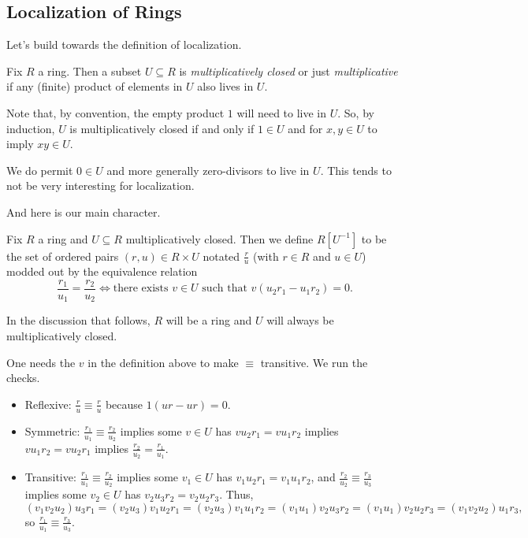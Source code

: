 \documentclass[../notes.tex]{subfiles}
\begin{document}
\subsection{Localization of Rings}
Let's build towards the definition of localization.
\begin{definition}
	Fix $R$ a ring. Then a subset $U\subseteq R$ is \textit{multiplicatively closed} or just \textit{multiplicative} if any (finite) product of elements in $U$ also lives in $U$.
\end{definition}
Note that, by convention, the empty product $1$ will need to live in $U$. So, by induction, $U$ is multiplicatively closed if and only if $1\in U$ and for $x,y\in U$ to imply $xy\in U$.
\begin{remark}
	We do permit $0\in U$ and more generally zero-divisors to live in $U$. This tends to not be very interesting for localization.
\end{remark}
And here is our main character.
\begin{definition}
	Fix $R$ a ring and $U\subseteq R$ multiplicatively closed. Then we define $R\left[U^{-1}\right]$ to be the set of ordered pairs $(r,u)\in R\times U$ notated $\frac ru$ (with $r\in R$ and $u\in U$) modded out by the equivalence relation
	\[\frac{r_1}{u_1}=\frac{r_2}{u_2}\iff\text{there exists }v\in U\text{ such that }v(u_2r_1-u_1r_2)=0.\]
\end{definition}
In the discussion that follows, $R$ will be a ring and $U$ will always be multiplicatively closed.
\begin{remark}[Nir] \label{lem:localizeequiv}
	One needs the $v$ in the definition above to make $\equiv$ transitive. We run the checks.
	\begin{itemize}
		\item Reflexive: $\frac ru\equiv\frac ru$ because $1(ur-ur)=0$.
		\item Symmetric: $\frac{r_1}{u_1}\equiv\frac{r_2}{u_2}$ implies some $v\in U$ has $vu_2r_1=vu_1r_2$ implies $vu_1r_2=vu_2r_1$ implies $\frac{r_2}{u_2}=\frac{r_1}{u_1}$.
		\item Transitive: $\frac{r_1}{u_1}\equiv\frac{r_2}{u_2}$ implies some $v_1\in U$ has $v_1u_2r_1=v_1u_1r_2$, and $\frac{r_2}{u_2}\equiv\frac{r_3}{u_3}$ implies some $v_2\in U$ has $v_2u_3r_2=v_2u_2r_3$. Thus,
		\[(v_1v_2u_2)u_3r_1=(v_2u_3)v_1u_2r_1=(v_2u_3)v_1u_1r_2=(v_1u_1)v_2u_3r_2=(v_1u_1)v_2u_2r_3=(v_1v_2u_2)u_1r_3,\]
		so $\frac{r_1}{u_1}\equiv\frac{r_3}{u_3}$.
	\end{itemize}
\end{remark}
\end{document}
